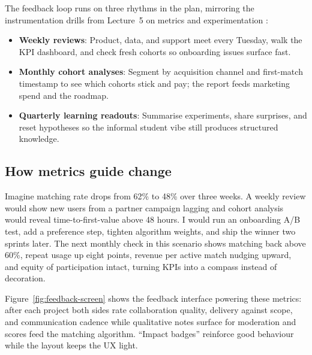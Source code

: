 The feedback loop runs on three rhythms in the plan, mirroring the instrumentation drills from Lecture~5 on metrics and experimentation \citep{Lecture05}:
\begin{itemize}
    \item \textbf{Weekly reviews}: Product, data, and support meet every Tuesday, walk the KPI dashboard, and check fresh cohorts so onboarding issues surface fast.
    \item \textbf{Monthly cohort analyses}: Segment by acquisition channel and first-match timestamp to see which cohorts stick and pay; the report feeds marketing spend and the roadmap.
    \item \textbf{Quarterly learning readouts}: Summarise experiments, share surprises, and reset hypotheses so the informal student vibe still produces structured knowledge.
\end{itemize}

\subsection*{How metrics guide change}
Imagine matching rate drops from 62\% to 48\% over three weeks. A weekly review would show new users from a partner campaign lagging and cohort analysis would reveal time-to-first-value above 48 hours. I would run an onboarding A/B test, add a preference step, tighten algorithm weights, and ship the winner two sprints later. The next monthly check in this scenario shows matching back above 60\%, repeat usage up eight points, revenue per active match nudging upward, and equity of participation intact, turning KPIs into a compass instead of decoration.

Figure~\ref{fig:feedback-screen} shows the feedback interface powering these metrics: after each project both sides rate collaboration quality, delivery against scope, and communication cadence while qualitative notes surface for moderation and scores feed the matching algorithm. ``Impact badges'' reinforce good behaviour while the layout keeps the UX light.

